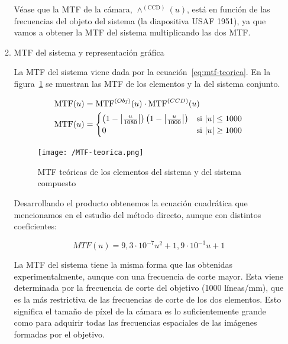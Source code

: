 \documentclass{./packages/optica-article}
\newcommand\MTF{\textrm{MTF}}
\begin{document}
\begin{enumerate}
\begin{enumerate}
		            Véase que la MTF de la cámara, $\wedge^{(\textrm{CCD})}(u)$, está en función de las frecuencias del objeto del sistema (la diapositiva USAF 1951), ya que vamos a obtener la MTF del sistema multiplicando las dos MTF.


		      \item MTF del sistema y representación gráfica

		            La MTF del sistema viene dada por la ecuación~\ref{eq:mtf-teorica}. En la figura~\ref{fig:mtf-teorica} se muestran las MTF de los elementos y la del sistema conjunto.

		            \begin{align}
			            \MTF(u) & = \MTF^{(Obj)}(u) \cdot \MTF^{(CCD)}(u) \\
			            \MTF(u) & =
			            \begin{cases}
				            \left(1-\abs{\frac{u}{1080}}\right)\left(1-\abs{\frac{u}{1000}}\right) & \textrm{si   $|u| \leq 1000$} \\
				            0                                                                      & \textrm{si  $|u| \geq 1000$}
			            \end{cases}
			            \label{eq:mtf-teorica}
		            \end{align}

		            \begin{figure}
			            \centering
			            \texttt{[image: /MTF-teorica.png]}
			            \caption{MTF teóricas de los elementos del sistema y del sistema compuesto}
			            \label{fig:mtf-teorica}
		            \end{figure}

		            Desarrollando el producto obtenemos la ecuación cuadrática que mencionamos en el estudio del método directo, aunque con distintos coeficientes:

		            \begin{equation*}
			            MTF(u) = 9,3 \cdot 10^{-7} u^2 + 1,9 \cdot 10^{-3} u + 1
		            \end{equation*}

		            La MTF del sistema tiene la misma forma que las obtenidas experimentalmente, aunque con una frecuencia de corte mayor. Esta viene determinada por la frecuencia de corte del objetivo (1000 líneas/mm), que es la más restrictiva de las frecuencias de corte de los dos elementos. Esto significa el tamaño de píxel de la cámara es lo suficientemente grande como para adquirir todas las frecuencias espaciales de las imágenes formadas por el objetivo.


\end{enumerate}
\end{enumerate}
\end{document}
